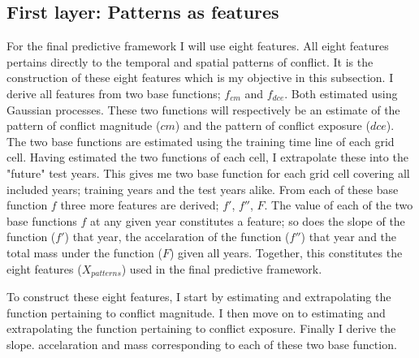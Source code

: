 \documentclass[a4paper]{article}
\begin{document}

\subsection{First layer: Patterns as features}


For the final predictive framework I will use eight features. All eight features pertains directly to the temporal and spatial patterns of conflict. It is the construction of these eight features which is my objective in this subsection. I derive all features from two base functions; $f_{cm}$ and $f_{dce}$. Both estimated using Gaussian processes. These two functions will respectively be an estimate of the pattern of conflict magnitude ($cm$) and the pattern of conflict exposure ($dce$). The two base functions are estimated using the training time line of each grid cell. Having estimated the two functions of each cell, I extrapolate these into the "future" test years. This gives me two base function for each grid cell covering all included years; training years and the test years alike. From each of these base function $f$ three more features are derived; $f'$, $f''$, $F$. The value of each of the two base functions $f$ at any given year constitutes a feature; so does the slope of the function ($f'$) that year, the accelaration of the function ($f''$) that year and the total mass under the function ($F$) given all years. Together, this constitutes the eight features ($X_{patterns}$) used in the final predictive framework.\par 

To construct these eight features, I start by estimating and extrapolating the function pertaining to conflict magnitude. I then move on to estimating and extrapolating the function pertaining to conflict exposure. Finally I derive the slope. accelaration and mass corresponding to each of these two base function.\par
\end{document}
